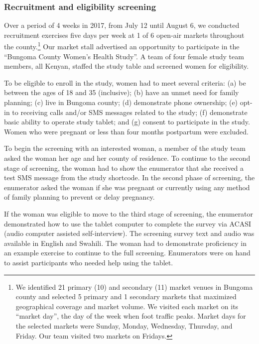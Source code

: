 \documentclass[man]{apa6}
\theoremstyle{definition}
\theoremstyle{definition}
\theoremstyle{definition}
\theoremstyle{remark}
\begin{document}
\hypertarget{recruitment-and-eligibility-screening}{%
\subsubsection{Recruitment and eligibility
screening}\label{recruitment-and-eligibility-screening}}

Over a period of 4 weeks in 2017, from July 12 until August 6, we
conducted recruitment exercises five days per week at 1 of 6 open-air
markets throughout the county.\footnote{We identified 21 primary (10)
  and secondary (11) market venues in Bungoma county and selected 5
  primary and 1 secondary markets that maximized geographical coverage
  and market volume. We visited each market on its \enquote{market day},
  the day of the week when foot traffic peaks. Market days for the
  selected markets were Sunday, Monday, Wednesday, Thursday, and Friday.
  Our team visited two markets on Fridays.} Our market stall advertised
an opportunity to participate in the \enquote{Bungoma County Women's
Health Study}. A team of four female study team members, all Kenyan,
staffed the study table and screened women for eligibility.

To be eligible to enroll in the study, women had to meet several
criteria: (a) be between the ages of 18 and 35 (inclusive); (b) have an
unmet need for family planning; (c) live in Bungoma county; (d)
demonstrate phone ownership; (e) opt-in to receiving calls and/or SMS
messages related to the study; (f) demonstrate basic ability to operate
study tablet; and (g) consent to participate in the study. Women who
were pregnant or less than four months postpartum were excluded.

To begin the screening with an interested woman, a member of the study
team asked the woman her age and her county of residence. To continue to
the second stage of screening, the woman had to show the enumerator that
she received a test SMS message from the study shortcode. In the second
phase of screening, the enumerator asked the woman if she was pregnant
or currently using any method of family planning to prevent or delay
pregnancy.

If the woman was eligible to move to the third stage of screening, the
enumerator demonstrated how to use the tablet computer to complete the
survey via ACASI (audio computer assisted self-interview). The screening
survey text and audio was available in English and Swahili. The woman
had to demonstrate proficiency in an example exercise to continue to the
full screening. Enumerators were on hand to assist participants who
needed help using the tablet.
\end{document}
